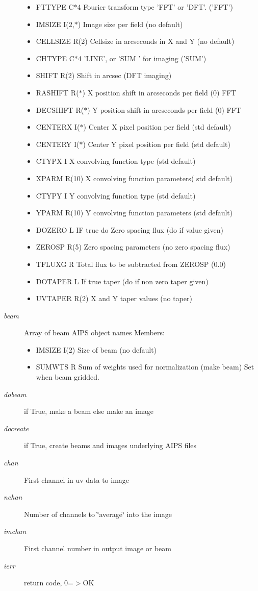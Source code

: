 \begin{Desc}
\begin{description}
\begin{itemize}
\item FTTYPE C$\ast$4 Fourier transform type 'FFT' or 'DFT'. ('FFT') \item IMSIZE I(2,$\ast$) Image size per field (no default) \item CELLSIZE R(2) Cellsize in arcseconds in X and Y (no default) \item CHTYPE C$\ast$4 'LINE', or 'SUM ' for imaging ('SUM') \item SHIFT R(2) Shift in arcsec (DFT imaging) \item RASHIFT R($\ast$) X position shift in arcseconds per field (0) FFT \item DECSHIFT R($\ast$) Y position shift in arcseconds per field (0) FFT \item CENTERX I($\ast$) Center X pixel position per field (std default) \item CENTERY I($\ast$) Center Y pixel position per field (std default) \item CTYPX I X convolving function type (std default) \item XPARM R(10) X convolving function parameters( std default) \item CTYPY I Y convolving function type (std default) \item YPARM R(10) Y convolving function parameters (std default) \item DOZERO L IF true do Zero spacing flux (do if value given) \item ZEROSP R(5) Zero spacing parameters (no zero spacing flux) \item TFLUXG R Total flux to be subtracted from ZEROSP (0.0) \item DOTAPER L If true taper (do if non zero taper given) \item UVTAPER R(2) X and Y taper values (no taper) \end{itemize}
\item[{\em beam}]Array of beam AIPS object names Members: \begin{itemize}
\item IMSIZE I(2) Size of beam (no default) \item SUMWTS R Sum of weights used for normalization (make beam) Set when beam gridded. \end{itemize}
\item[{\em dobeam}]if True, make a beam else make an image \item[{\em docreate}]if True, create beams and images underlying AIPS files \item[{\em chan}]First channel in uv data to image \item[{\em nchan}]Number of channels to \char`\"{}average\char`\"{} into the image \item[{\em imchan}]First channel number in output image or beam \item[{\em ierr}]return code, 0=$>$OK \end{description}
\end{Desc}

